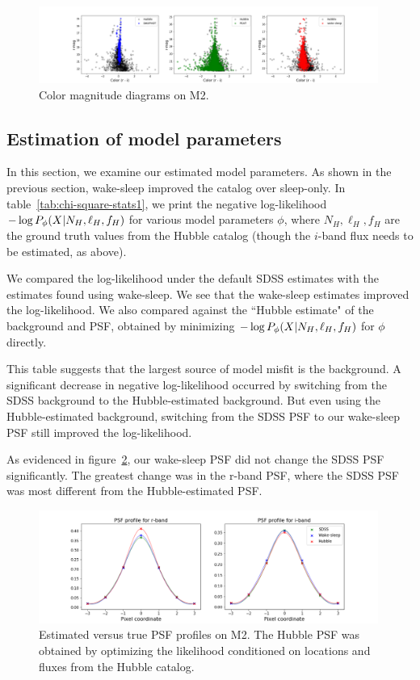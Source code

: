 \begin{figure}[h]
    \centering
    \includegraphics[width=0.99\textwidth]{figures/cmd.png}
    \caption{Color magnitude diagrams on M2. }
    \label{fig:cmd_m2}
\end{figure}


\subsection{Estimation of model parameters}
\label{sec:results_model_params}
In this section, we examine our estimated model parameters. As shown in the previous section, wake-sleep improved the catalog over sleep-only. In table~\ref{tab:chi-square-stats1}, we
print the negative log-likelihood $- \log P_\phi(X | N_{H}, \ell_{H}, f_{H})$ for various model parameters $\phi$, where $N_{H}, \ell_{H}, f_{H}$ are the ground truth
values from the Hubble catalog (though the $i$-band flux needs to be estimated, as above). 

We compared the log-likelihood under the default SDSS estimates with the estimates found using wake-sleep. We see that the wake-sleep estimates improved the log-likelihood. We also compared against the ``Hubble estimate" of the background and PSF, obtained by minimizing 
$- \log P_\phi(X | N_{H}, \ell_{H}, f_{H})$ for $\phi$ directly. 

This table suggests that the largest source of model misfit is the background. A significant decrease in negative log-likelihood occurred by switching from the SDSS background to the Hubble-estimated background. 
But even using the Hubble-estimated background, switching from the SDSS PSF to our wake-sleep PSF still improved the log-likelihood. 



As evidenced in figure~\ref{fig:psf_profiles}, our wake-sleep PSF did not change the SDSS PSF significantly. The greatest change was in the r-band PSF, where the SDSS PSF was most different from the Hubble-estimated PSF. 

\begin{figure}[h]
    \centering
    \includegraphics[width=0.99\textwidth]{figures/psf_profiles.png}
    \caption{Estimated versus true PSF profiles on M2. The Hubble PSF was
    obtained by optimizing the likelihood conditioned on locations and fluxes
    from the Hubble catalog. }
    \label{fig:psf_profiles}
\end{figure}


